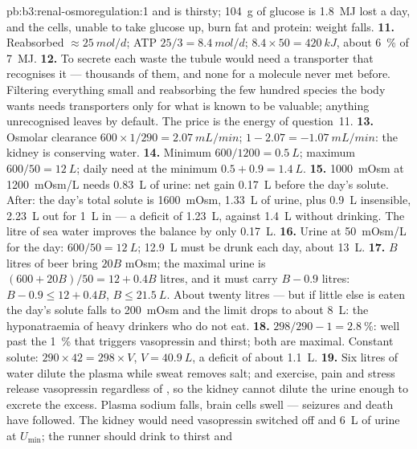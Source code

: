 \begin{solution}{pb:b3:renal-osmoregulation:1}
and is thirsty; \qty{104}{g} of glucose is \qty{1.8}{MJ} lost a day, and
the cells, unable to take glucose up, burn fat and protein: weight
falls.
\textbf{11.} Reabsorbed $\approx \qty{25}{mol/d}$; ATP $25/3 =
\qty{8.4}{mol/d}$; $8.4\times 50 = \qty{420}{kJ}$, about \qty{6}{\%}
of \qty{7}{MJ}.
\textbf{12.} To secrete each waste the tubule would need a transporter
that recognises it --- thousands of them, and none for a molecule never
met before. Filtering everything small and reabsorbing the few hundred
species the body wants needs transporters only for what is known to be
valuable; anything unrecognised leaves by default. The price is the
energy of question~11.
\textbf{13.} Osmolar clearance $600\times 1/290 = \qty{2.07}{mL/min}$;
 $1 - 2.07 = -\qty{1.07}{mL/min}$: the kidney is
conserving water.
\textbf{14.} Minimum $600/1200 = \qty{0.5}{L}$; maximum $600/50 =
\qty{12}{L}$; daily need at the minimum $0.5 + 0.9 = \qty{1.4}{L}$.
\textbf{15.} \qty{1000}{mOsm} at \qty{1200}{mOsm/L} needs
\qty{0.83}{L} of urine: net gain \qty{0.17}{L} before the day's solute.
After: the day's total solute is \qty{1600}{mOsm}, \qty{1.33}{L} of
urine, plus \qty{0.9}{L} insensible, \qty{2.23}{L} out for \qty{1}{L}
in --- a deficit of \qty{1.23}{L}, against \qty{1.4}{L} without drinking.
The litre of sea water improves the balance by only \qty{0.17}{L}.
\textbf{16.} Urine at \qty{50}{mOsm/L} for the day: $600/50 =
\qty{12}{L}$; \qty{12.9}{L} must be drunk each day, about \qty{13}{L}.
\textbf{17.} $B$ litres of beer bring $20B$ mOsm; the maximal urine is
$(600 + 20B)/50 = 12 + 0.4B$ litres, and it must carry $B - 0.9$
litres: $B - 0.9 \le 12 + 0.4B$, $B \le \qty{21.5}{L}$. About twenty
litres --- but if little else is eaten the day's solute falls to
\qty{200}{mOsm} and the limit drops to about \qty{8}{L}: the
hyponatraemia of heavy drinkers who do not eat.
\textbf{18.} $298/290 - 1 = \qty{2.8}{\%}$: well past the \qty{1}{\%} that
triggers vasopressin and thirst; both are maximal. Constant solute:
$290\times 42 = 298\times V$, $V = \qty{40.9}{L}$, a deficit of about
\qty{1.1}{L}.
\textbf{19.} Six litres of water dilute the plasma while sweat removes
salt; and exercise, pain and stress release vasopressin regardless of
, so the kidney cannot dilute the urine enough to excrete the
excess. Plasma sodium falls, brain cells swell --- seizures and death
have followed. The kidney would need vasopressin switched off and
\qty{6}{L} of urine at $U_{\min}$; the runner should drink to thirst and

\end{solution}
